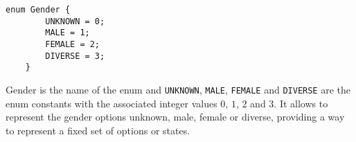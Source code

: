 \documentclass[../MasterThesis.tex]{subfiles}
\begin{document}
\begin{description}[font=\normalfont\color{RedViolet!80!black}, style=nextline]
\begin{lstlisting}[style=protobufStyle, numbers=none]
	enum Gender {
		UNKNOWN = 0;
		MALE = 1;
		FEMALE = 2;
		DIVERSE = 3;
	}
\end{lstlisting}

Gender is the name of the enum and \texttt{UNKNOWN}, \texttt{MALE}, \texttt{FEMALE} and \texttt{DIVERSE} are the enum constants with the associated integer values $0$, $1$, $2$ and $3$.
It allows to represent the gender options unknown, male, female or diverse, providing a way to represent a fixed set of options or states.



\end{description}


	
\end{document}
